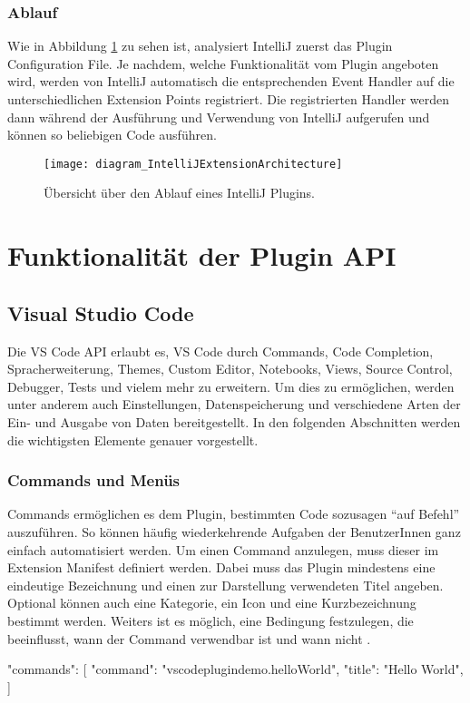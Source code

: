 \subsubsection{Ablauf}
  Wie in Abbildung \ref{fig:diagram_IntelliJExtensionArchitecture} zu sehen ist,
  analysiert IntelliJ zuerst das Plugin Configuration File.
  Je nachdem, welche Funktionalität vom Plugin angeboten wird, werden
  von IntelliJ automatisch die entsprechenden Event Handler 
  auf die unterschiedlichen Extension Points registriert. 
  Die registrierten Handler werden dann während der Ausführung und Verwendung
  von IntelliJ aufgerufen und können so beliebigen Code ausführen.
  \begin{figure}
    \centering
    \texttt{[image: diagram\_IntelliJExtensionArchitecture]}
    \caption{Übersicht über den Ablauf eines IntelliJ Plugins.}
    \label{fig:diagram_IntelliJExtensionArchitecture}
  \end{figure}   

\section{Funktionalität der Plugin API}
\label{sec:FunktionalitätDerPluginAPI}

\subsection{Visual Studio Code}

Die VS Code API erlaubt es, VS Code durch Commands, Code Completion, Spracherweiterung, 
Themes, Custom Editor, Notebooks, Views, Source Control, Debugger, Tests und vielem mehr zu
erweitern. Um dies zu ermöglichen, werden unter anderem auch Einstellungen, Datenspeicherung
und verschiedene Arten der Ein- und Ausgabe von Daten bereitgestellt. In den folgenden Abschnitten
werden die wichtigsten Elemente genauer vorgestellt.

\subsubsection{Commands und Menüs}
  Commands ermöglichen es dem Plugin, bestimmten Code sozusagen \enquote{auf Befehl} auszuführen.
  So können häufig wiederkehrende Aufgaben der BenutzerInnen ganz einfach automatisiert werden.
  Um einen Command anzulegen, muss dieser im Extension Manifest definiert werden. Dabei muss
  das Plugin mindestens eine eindeutige Bezeichnung und einen zur Darstellung verwendeten Titel angeben.
  Optional können auch eine Kategorie, ein Icon und eine Kurzbezeichnung bestimmt werden. 
  Weiters ist es möglich, eine Bedingung festzulegen, die beeinflusst, wann
  der Command verwendbar ist und wann nicht \cite{VSCodeExtensionAPIContributionPointsCommands}.
\begin{JsCode}
    "commands": [
      {
        "command": "vscodeplugindemo.helloWorld",
        "title": "Hello World",
      }
    ] 
\end{JsCode}

